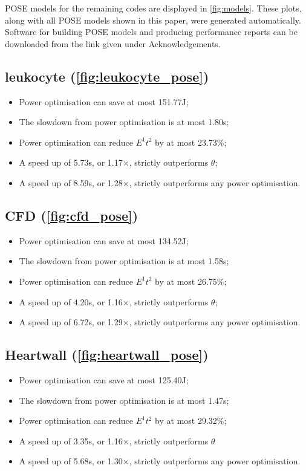\label{sec:appendix}
POSE models for the remaining codes are displayed in \autoref{fig:models}. These plots, along with all POSE models shown in this paper, were generated automatically. Software for building POSE models and producing performance reports can be downloaded from the link given under Acknowledgements.

\subsection{leukocyte (\autoref{fig:leukocyte_pose})}
\begin{itemize}
  \item Power optimisation can save at most 151.77J;
  \item The slowdown from power optimisation is at most 1.80s;
  \item Power optimisation can reduce $E^1t^2$ by at most 23.73\%;
  \item A speed up of 5.73s, or 1.17$\times$, strictly outperforms $\theta$;
  \item A speed up of 8.59s, or 1.28$\times$, strictly outperforms any power optimisation.
\end{itemize}

\subsection{CFD (\autoref{fig:cfd_pose})}
\begin{itemize}
  \item Power optimisation can save at most 134.52J;
  \item The slowdown from power optimisation is at most 1.58s;
  \item Power optimisation can reduce $E^1t^2$ by at most 26.75\%;
  \item A speed up of 4.20s, or 1.16$\times$, strictly outperforms $\theta$;
  \item A speed up of 6.72s, or 1.29$\times$, strictly outperforms any power optimisation.
\end{itemize}

\subsection{Heartwall (\autoref{fig:heartwall_pose})}
\begin{itemize}
  \item Power optimisation can save at most 125.40J;
  \item The slowdown from power optimisation is at most 1.47s;
  \item Power optimisation can reduce $E^1t^2$ by at most 29.32\%;
  \item A speed up of 3.35s, or 1.16$\times$, strictly outperforms $\theta$
  \item A speed up of 5.68s, or 1.30$\times$, strictly outperforms any power optimisation.
\end{itemize}

